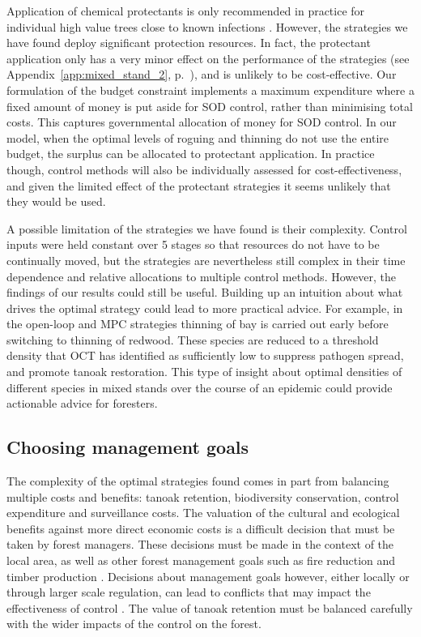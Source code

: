 Application of chemical protectants is only recommended in practice for individual high value trees close to known infections \citep{comtf_sudden_2014}. However, the strategies we have found deploy significant protection resources. In fact, the protectant application only has a very minor effect on the performance of the strategies (see Appendix~\ref{app:mixed_stand_2}, p.~\pageref{app:mixed_stand_2}), and is unlikely to be cost-effective. Our formulation of the budget constraint implements a maximum expenditure where a fixed amount of money is put aside for SOD control, rather than minimising total costs. This captures governmental allocation of money for SOD control. In our model, when the optimal levels of roguing and thinning do not use the entire budget, the surplus can be allocated to protectant application. In practice though, control methods will also be individually assessed for cost-effectiveness, and given the limited effect of the protectant strategies it seems unlikely that they would be used.

A possible limitation of the strategies we have found is their complexity. Control inputs were held constant over \SI{5}{\year} stages so that resources do not have to be continually moved, but the strategies are nevertheless still complex in their time dependence and relative allocations to multiple control methods. However, the findings of our results could still be useful. Building up an intuition about what drives the optimal strategy could lead to more practical advice. For example, in the open-loop and MPC strategies thinning of bay is carried out early before switching to thinning of redwood. These species are reduced to a threshold density that OCT has identified as sufficiently low to suppress pathogen spread, and promote tanoak restoration. This type of insight about optimal densities of different species in mixed stands over the course of an epidemic could provide actionable advice for foresters.

\subsection{Choosing management goals}

The complexity of the optimal strategies found comes in part from balancing multiple costs and benefits: tanoak retention, biodiversity conservation, control expenditure and surveillance costs. The valuation of the cultural and ecological benefits against more direct economic costs is a difficult decision that must be taken by forest managers. These decisions must be made in the context of the local area, as well as other forest management goals such as fire reduction and timber production \citep{cobb_resiliency_2017}. Decisions about management goals however, either locally or through larger scale regulation, can lead to conflicts that may impact the effectiveness of control \citep{alexander_lessons_2010}. The value of tanoak retention must be balanced carefully with the wider impacts of the control on the forest.

